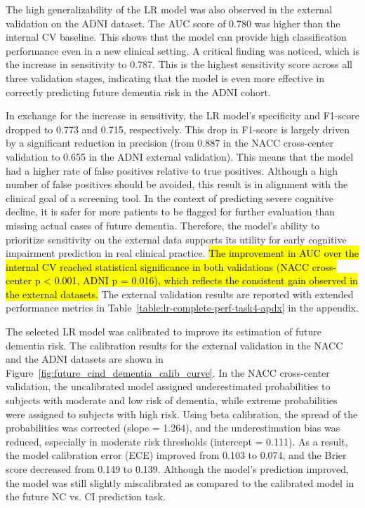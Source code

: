 The high generalizability of the LR model was also observed in the external validation on the ADNI dataset. The AUC score of 0.780 was higher than the internal CV baseline. This shows that the model can provide high classification performance even in a new clinical setting. A critical finding was noticed, which is the increase in sensitivity to 0.787. This is the highest sensitivity score across all three validation stages, indicating that the model is even more effective in correctly predicting future dementia risk in the ADNI cohort. 

In exchange for the increase in sensitivity, the LR model's specificity and F1-score dropped to 0.773 and 0.715, respectively. This drop in F1-score is largely driven by a significant reduction in precision (from 0.887 in the NACC cross-center validation to 0.655 in the ADNI external validation). This means that the model had a higher rate of false positives relative to true positives. Although a high number of false positives should be avoided, this result is in alignment with the clinical goal of a screening tool. In the context of predicting severe cognitive decline, it is safer for more patients to be flagged for further evaluation than missing actual cases of future dementia. Therefore, the model's ability to prioritize sensitivity on the external data supports its utility for early cognitive impairment prediction in real clinical practice. \hl{The improvement in AUC over the internal CV reached statistical significance in both validations (NACC cross-center p < 0.001, ADNI p = 0.016), which reflects the consistent gain observed in the external datasets.} The external validation results are reported with extended performance metrics in Table~\ref{table:lr-complete-perf-task4-apdx} in the appendix.

The selected LR model was calibrated to improve its estimation of future dementia risk. The calibration results for the external validation in the NACC and the ADNI datasets are shown in Figure~\ref{fig:future_cind_dementia_calib_curve}. In the NACC cross-center validation, the uncalibrated model assigned underestimated probabilities to subjects with moderate and low risk of dementia, while extreme probabilities were assigned to subjects with high risk. Using beta calibration, the spread of the probabilities was corrected (slope = 1.264), and the underestimation bias was reduced, especially in moderate risk thresholds (intercept = 0.111). As a result, the model calibration error (ECE) improved from 0.103 to 0.074, and the Brier score decreased from 0.149 to 0.139. Although the model's prediction improved, the model was still slightly miscalibrated as compared to the calibrated model in the future NC vs. CI prediction task.

